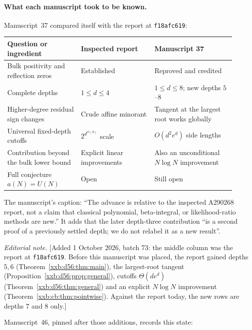 \documentclass[11pt,a4paper]{article}
\numberwithin{equation}{section}
\theoremstyle{definition}
\theoremstyle{remark}
\theoremstyle{plain}
\begin{document}
\paragraph{What each manuscript took to be known.}  Manuscript~37 compared
itself with the report at \texttt{f18afc619}:

\begin{center}
\small
\begin{tabular}{@{}p{0.30\linewidth}p{0.30\linewidth}p{0.33\linewidth}@{}}
\toprule
Question or ingredient & Inspected report & Manuscript 37\\
\midrule
Bulk positivity and reflection zeros & Established & Reproved and credited\\
Complete depths & $1\le d\le4$ & $1\le d\le8$; new depths $5$--$8$\\
Higher-degree residual sign changes & Crude affine minorant & Tangent at the largest root works globally\\
Universal fixed-depth cutoffs & $2^{d^{O(d)}}$ scale & $O(d^2e^d)$ side lengths\\
Contribution beyond the bulk lower bound & Explicit linear improvements & Also an unconditional $N\log N$ improvement\\
Full conjecture $a(N)=U(N)$ & Open & Still open\\
\bottomrule
\end{tabular}
\end{center}
The manuscript's caption: ``The advance is relative to the inspected A290268
report, not a claim that classical polynomial, beta-integral, or
likelihood-ratio methods are new.''  It adds that the later depth-three
contribution ``is a second proof of a previously settled depth; we do not
relabel it as a new result''.

\emph{Editorial note.}  [Added 1 October 2026, batch 73: the middle column was
the report at \texttt{f18afc619}.  Before this manuscript was placed, the
report gained depths $5,6$ (Theorem~\ref{xxb:d56:thm:main}), the
largest-root tangent (Proposition~\ref{xxb:d56:prop:general}), cutoffs
$\Theta(de^d)$ (Theorem~\ref{xxb:d56:thm:general}) and an explicit $N\log N$
improvement (Theorem~\ref{xxb:cb:thm:pointwise}).  Against the report today,
the new rows are depths $7$ and $8$ only.]

Manuscript~46, pinned after those additions, records this state:
\end{document}
